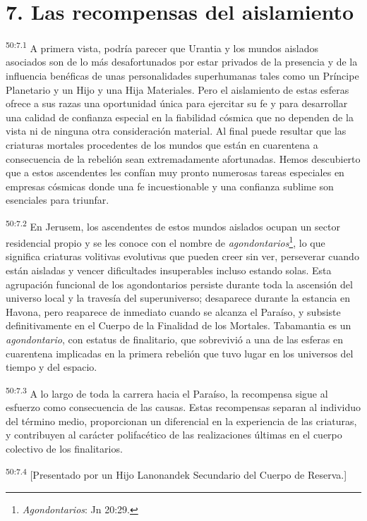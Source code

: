 \section*{7. Las recompensas del aislamiento}
\par
\textsuperscript{50:7.1} A primera vista, podría parecer que Urantia y los mundos aislados asociados son de lo más desafortunados por estar privados de la presencia y de la influencia benéficas de unas personalidades superhumanas tales como un Príncipe Planetario y un Hijo y una Hija Materiales. Pero el aislamiento de estas esferas ofrece a sus razas una oportunidad única para ejercitar su fe y para desarrollar una calidad de confianza especial en la fiabilidad cósmica que no dependen de la vista ni de ninguna otra consideración material. Al final puede resultar que las criaturas mortales procedentes de los mundos que están en cuarentena a consecuencia de la rebelión sean extremadamente afortunadas. Hemos descubierto que a estos ascendentes les confían muy pronto numerosas tareas especiales en empresas cósmicas donde una fe incuestionable y una confianza sublime son esenciales para triunfar.

\par
\textsuperscript{50:7.2} En Jerusem, los ascendentes de estos mundos aislados ocupan un sector residencial propio y se les conoce con el nombre de \textit{agondontarios}\footnote{\textit{Agondontarios}: Jn 20:29.}, lo que significa criaturas volitivas evolutivas que pueden creer sin ver, perseverar cuando están aisladas y vencer dificultades insuperables incluso estando solas. Esta agrupación funcional de los agondontarios persiste durante toda la ascensión del universo local y la travesía del superuniverso; desaparece durante la estancia en Havona, pero reaparece de inmediato cuando se alcanza el Paraíso, y subsiste definitivamente en el Cuerpo de la Finalidad de los Mortales. Tabamantia es un \textit{agondontario}, con estatus de finalitario, que sobrevivió a una de las esferas en cuarentena implicadas en la primera rebelión que tuvo lugar en los universos del tiempo y del espacio.

\par
\textsuperscript{50:7.3} A lo largo de toda la carrera hacia el Paraíso, la recompensa sigue al esfuerzo como consecuencia de las causas. Estas recompensas separan al individuo del término medio, proporcionan un diferencial en la experiencia de las criaturas, y contribuyen al carácter polifacético de las realizaciones últimas en el cuerpo colectivo de los finalitarios.

\par
\textsuperscript{50:7.4} [Presentado por un Hijo Lanonandek Secundario del Cuerpo de Reserva.]